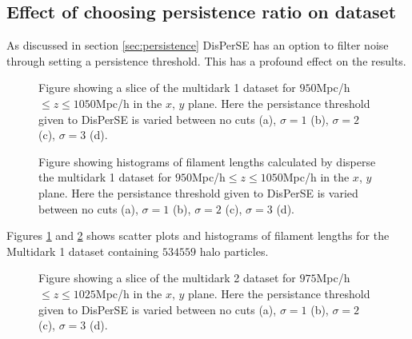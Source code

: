 \subsection{Effect of choosing persistence ratio on dataset}
As discussed in section \ref{sec:persistence} DisPerSE has an option to filter
noise through setting a persistence threshold. This has a profound effect on the
results.
\begin{figure}[htbp]\label{fig:scatterMD1}
    \hspace{1em}%
    \hspace{1em}%
    \caption{Figure showing a slice of the multidark 1 dataset for $950$Mpc/h$\leq z\leq1050$Mpc/h in the $x$, $y$ plane. Here the persistance threshold given to DisPerSE is varied between no cuts (a), $\sigma=1$ (b), $\sigma=2$ (c), $\sigma=3$ (d).}
\end{figure}
\begin{figure}[htbp]\label{fig:histMD1}
    \hspace{1em}%
    \hspace{1em}%
    \caption{Figure showing histograms of filament lengths calculated by disperse the multidark 1 dataset for $950$Mpc/h$\leq z\leq1050$Mpc/h in the $x$, $y$ plane. Here the persistance threshold given to DisPerSE is varied between no cuts (a), $\sigma=1$ (b), $\sigma=2$ (c), $\sigma=3$ (d).}
\end{figure}
Figures \ref{fig:scatterMD1} and \ref{fig:histMD1} shows scatter plots and
histograms of filament lengths for the Multidark 1 dataset containing $534559$
halo particles.
\begin{figure}[htbp]
    \hspace{1em}%
    \hspace{1em}%
    \caption{Figure showing a slice of the multidark 2 dataset for $975$Mpc/h $\leq z\leq1025$Mpc/h in the $x$, $y$ plane. Here the persistance threshold given to DisPerSE is varied between no cuts (a), $\sigma=1$ (b), $\sigma=2$ (c), $\sigma=3$ (d).}
\end{figure}
